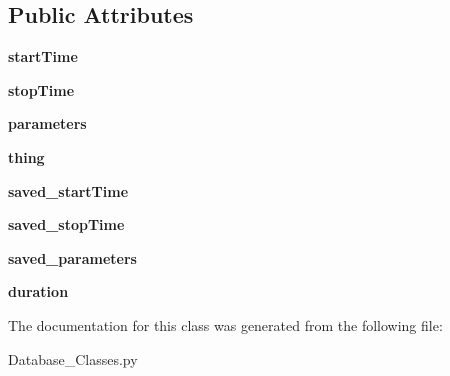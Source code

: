 \subsection*{Public Attributes}
\begin{DoxyCompactItemize}
\item 
\hypertarget{classDatabase__Classes_1_1Activity_a4304d966ad1a565b353c37e221f8550a}{{\bfseries start\-Time}}\label{classDatabase__Classes_1_1Activity_a4304d966ad1a565b353c37e221f8550a}

\item 
\hypertarget{classDatabase__Classes_1_1Activity_a2dd5e500b88ceced9a749435fa6058b3}{{\bfseries stop\-Time}}\label{classDatabase__Classes_1_1Activity_a2dd5e500b88ceced9a749435fa6058b3}

\item 
\hypertarget{classDatabase__Classes_1_1Activity_a6ab830b6302d0a004977142fe18b0aff}{{\bfseries parameters}}\label{classDatabase__Classes_1_1Activity_a6ab830b6302d0a004977142fe18b0aff}

\item 
\hypertarget{classDatabase__Classes_1_1Activity_a41af32da7c5e4ce656188b809198d535}{{\bfseries thing}}\label{classDatabase__Classes_1_1Activity_a41af32da7c5e4ce656188b809198d535}

\item 
\hypertarget{classDatabase__Classes_1_1Activity_a71776c12e44d9f064f4c30a5a170ab9d}{{\bfseries saved\-\_\-start\-Time}}\label{classDatabase__Classes_1_1Activity_a71776c12e44d9f064f4c30a5a170ab9d}

\item 
\hypertarget{classDatabase__Classes_1_1Activity_a7e5e0fcdeae75539c0fcfc2a6788d69b}{{\bfseries saved\-\_\-stop\-Time}}\label{classDatabase__Classes_1_1Activity_a7e5e0fcdeae75539c0fcfc2a6788d69b}

\item 
\hypertarget{classDatabase__Classes_1_1Activity_ad16876c648873ca8bf1f0c6d13a79951}{{\bfseries saved\-\_\-parameters}}\label{classDatabase__Classes_1_1Activity_ad16876c648873ca8bf1f0c6d13a79951}

\item 
\hypertarget{classDatabase__Classes_1_1Activity_a7e6a413c84129b8b71839ee3a86c8bed}{{\bfseries duration}}\label{classDatabase__Classes_1_1Activity_a7e6a413c84129b8b71839ee3a86c8bed}

\end{DoxyCompactItemize}


The documentation for this class was generated from the following file\-:\begin{DoxyCompactItemize}
\item 
Database\-\_\-\-Classes.\-py\end{DoxyCompactItemize}
